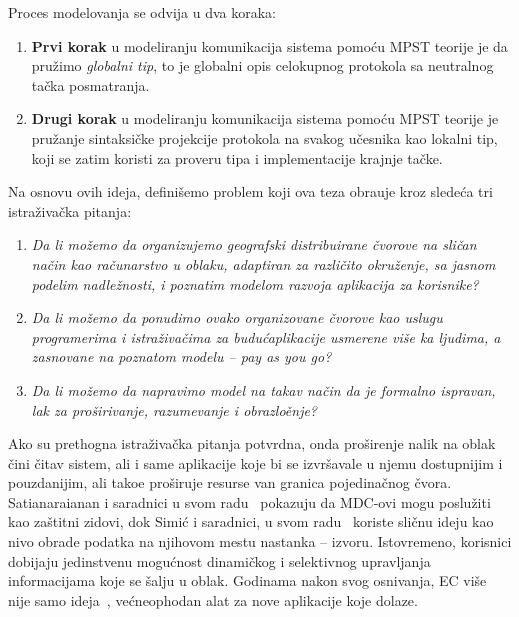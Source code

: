 Proces modelovanja se odvija u dva koraka:

\begin{enumerate}[start=1,label={(\bfseries \arabic*)}]
	\item \textbf{Prvi korak} u modeliranju komunikacija sistema pomoću MPST teorije je da pru\v zimo \emph{globalni tip}, to je globalni opis celokupnog protokola sa neutralnog ta\v cka posmatranja.
	\item \textbf{Drugi korak} u modeliranju komunikacija sistema pomoću MPST teorije je pru\v zanje sintaksi\v cke projekcije protokola na svakog u\v cesnika kao lokalni tip, koji se zatim koristi za proveru tipa i implementacije krajnje ta\v cke.
\end{enumerate}

Na osnovu ovih ideja, definišemo problem koji ova teza obra\dj uje kroz slede\'ca tri istra\v ziva\v cka pitanja:

\begin{enumerate}[start=1,label={(\bfseries \arabic*)}]\label{rez:questions}
	\item \textit{Da li mo\v zemo da organizujemo geografski distribuirane \v cvorove na sli\v can na\v cin kao ra\v cunarstvo u oblaku, adaptiran za razli\v cito okru\v zenje, sa jasnom podelim nadle\v znosti, i poznatim modelom razvoja aplikacija za korisnike?}
	\item \textit{Da li mo\v zemo da ponudimo ovako organizovane \v cvorove kao uslugu programerima i istra\v ziva\v cima za budu\'caplikacije usmerene vi\v se ka ljudima, a zasnovane na poznatom modelu -- pay as you go?}
	\item \textit{Da li mo\v zemo da napravimo model na takav na\v cin da je formalno ispravan, lak za pro\v sirivanje, razumevanje i obrazlo\v enje?}
\end{enumerate}

Ako su prethogna istra\v ziva\v cka pitanja potvrdna, onda pro\v sirenje nalik na oblak \v cini \v citav sistem, ali i same aplikacije koje bi se izvr\v savale u njemu dostupnijim i pouzdanijim, ali tako\dj e pro\v siruje resurse van granica pojedina\v cnog \v cvora. Satianaraianan i saradnici u svom radu~\cite{SatyanarayananK19} pokazuju da MDC-ovi mogu poslu\v ziti kao za\v stitni zidovi, dok Simi\'c i saradnici, u svom radu~\cite {inproceedingsSimic1} koriste sli\v cnu ideju kao nivo obrade podatka na njihovom mestu nastanka -- izvoru. Istovremeno, korisnici dobijaju jedinstvenu mogu\'cnost dinami\v ckog i selektivnog upravljanja informacijama koje se \v salju u oblak. Godinama nakon svog osnivanja, EC vi\v se nije samo ideja~\cite {SatyanarayananK19}, ve\'cneophodan alat za nove aplikacije koje dolaze.

